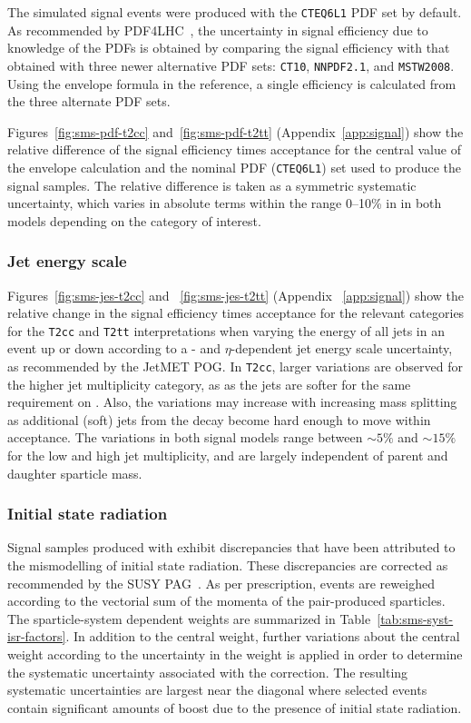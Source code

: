 The simulated signal events were produced with the \verb!CTEQ6L1! PDF
set by default.  As recommended by PDF4LHC~\cite{pdf4lhc}, the uncertainty
in signal efficiency due to knowledge of the PDFs is obtained by comparing 
the signal efficiency with that obtained with three newer alternative PDF 
sets: \verb!CT10!, \verb!NNPDF2.1!, and \verb!MSTW2008!. Using the envelope
formula in the reference, a single efficiency is calculated from the three alternate
PDF sets. 

Figures~\ref{fig:sms-pdf-t2cc} and~\ref{fig:sms-pdf-t2tt} 
(Appendix~\ref{app:signal}) show the relative difference of the signal 
efficiency times acceptance for the central value of the envelope calculation 
and the nominal PDF (\verb!CTEQ6L1!) set used to produce the signal 
samples. The relative difference is taken as a symmetric systematic 
uncertainty, which varies in absolute terms within the range 0--10\% in 
in both models depending on the category of interest.

\subsubsection{Jet energy scale\label{sec:sms-syst-jes}}

Figures~\ref{fig:sms-jes-t2cc} and ~\ref{fig:sms-jes-t2tt} 
(Appendix ~\ref{app:signal}) show the relative change in the 
signal efficiency times acceptance for the relevant categories for 
the \verb!T2cc! and \verb!T2tt! interpretations when varying the energy 
of all jets in an event up or down according to a \pt- and $\eta$-dependent 
jet energy scale uncertainty, as recommended by the JetMET POG. 
In \verb!T2cc!, larger variations are observed for the higher 
jet multiplicity category, as as the jets are softer for the same 
requirement on \scalht. Also, the variations may increase with 
increasing mass splitting as additional (soft) jets from the decay 
become hard enough to move within acceptance. The variations in both 
signal models range between $\sim5\%$ and $\sim15\%$ for the low 
and high jet multiplicity, and are largely independent of parent 
and daughter sparticle mass. 

\subsubsection{Initial state radiation\label{sec:sms-syst-isr}}

Signal samples produced with \MADGRAPH exhibit discrepancies that 
have been attributed to the mismodelling of initial state radiation.
These discrepancies are corrected as recommended by the SUSY 
PAG~\cite{susy-isrrw}. As per prescription, events are reweighed
according to the vectorial sum of the momenta of the pair-produced
sparticles. The sparticle-system \Pt dependent weights are summarized in  
Table~\ref{tab:sms-syst-isr-factors}.   In addition to the central weight, 
further variations about the central weight according to the uncertainty 
in the weight is applied in order to determine the systematic uncertainty
associated with the correction. The resulting systematic uncertainties 
are largest near the diagonal where selected events contain significant 
amounts of boost due to the presence of initial state radiation. 

